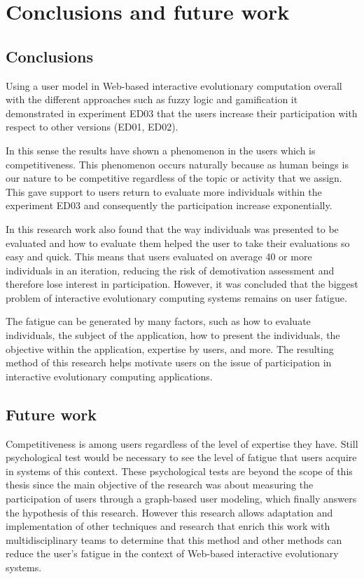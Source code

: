 \chapter{Conclusions and future work} \label{sec:5}

\section{Conclusions}

Using a user model in Web-based interactive evolutionary computation  overall
with the different approaches such as fuzzy logic and gamification it
demonstrated  in experiment ED03 that the users increase their
participation with respect to other versions (ED01, ED02).

In this sense the results have shown a phenomenon in the users which is
competitiveness. This phenomenon occurs naturally because as human beings is our
nature to be competitive regardless of the topic or activity that we assign.
This gave support to users return to evaluate more individuals
within the experiment ED03 and consequently the participation increase
exponentially.

In this research work also found that the way individuals was presented to be
evaluated and how to evaluate them helped the user to take their evaluations so
easy and quick. This means that users evaluated on average 40 or more
individuals in an iteration, reducing the risk of demotivation assessment and
therefore lose interest in participation. However, it was concluded that the
biggest problem of interactive evolutionary computing systems remains on user
fatigue.

The fatigue can be generated by many factors, such as how to evaluate
individuals, the subject of the application, how to present the individuals, the
objective within the application, expertise by users, and more. The resulting
method of this research helps motivate users on the issue of participation in
interactive evolutionary computing applications.


\section{Future work}

Competitiveness is among users regardless of the level of expertise they have.
Still psychological test would be necessary to see the level of fatigue that
users acquire in systems of this context. These psychological tests are beyond
the scope of this thesis since the main objective of the research was about
measuring the participation of users through a graph-based user modeling, which
finally answers  the hypothesis of this research. However this research allows
adaptation and implementation of other techniques and research that enrich this
work with multidisciplinary teams to determine that this method and other
methods can reduce the user's fatigue in the context of Web-based interactive
evolutionary systems.


